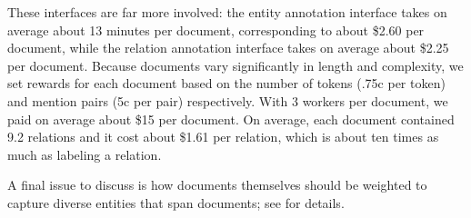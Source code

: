 These interfaces  are far more involved: the entity annotation interface takes on average about 13 minutes per document, corresponding to about \$2.60 per document, while the relation annotation interface takes on average about \$2.25 per document.
Because documents vary significantly in length and complexity, we set rewards for each document based on the number of tokens (.75c per token) and mention pairs (5c per pair) respectively.
With 3 workers per document, we paid on average about \$15 per document.
On average, each document contained 9.2 relations and it cost about \$1.61 per relation, which is about ten times as much as labeling a relation.

A final issue to discuss is how documents themselves should be weighted to capture diverse entities that span documents; see  for details.
